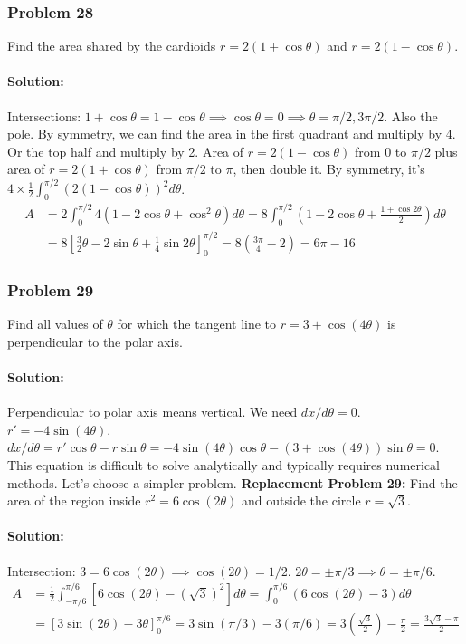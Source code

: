 \documentclass{article}
\begin{document}
\subsubsection*{Problem 28}
Find the area shared by the cardioids $r=2(1+\cos\theta)$ and $r=2(1-\cos\theta)$.
\paragraph{Solution:}
Intersections: $1+\cos\theta=1-\cos\theta \implies \cos\theta=0 \implies \theta=\pi/2, 3\pi/2$. Also the pole.
By symmetry, we can find the area in the first quadrant and multiply by 4. Or the top half and multiply by 2.
Area of $r=2(1-\cos\theta)$ from $0$ to $\pi/2$ plus area of $r=2(1+\cos\theta)$ from $\pi/2$ to $\pi$, then double it.
By symmetry, it's $4 \times \frac{1}{2} \int_0^{\pi/2} (2(1-\cos\theta))^2 d\theta$.
\begin{align*} A &= 2 \int_0^{\pi/2} 4(1-2\cos\theta+\cos^2\theta) d\theta = 8 \int_0^{\pi/2} (1-2\cos\theta+\frac{1+\cos2\theta}{2}) d\theta \\ &= 8 [\frac{3}{2}\theta-2\sin\theta+\frac{1}{4}\sin2\theta]_0^{\pi/2} = 8(\frac{3\pi}{4}-2) = 6\pi - 16 \end{align*}

\subsubsection*{Problem 29}
Find all values of $\theta$ for which the tangent line to $r=3+\cos(4\theta)$ is perpendicular to the polar axis.
\paragraph{Solution:}
Perpendicular to polar axis means vertical. We need $dx/d\theta=0$.
$r' = -4\sin(4\theta)$.
$dx/d\theta = r'\cos\theta - r\sin\theta = -4\sin(4\theta)\cos\theta - (3+\cos(4\theta))\sin\theta = 0$.
This equation is difficult to solve analytically and typically requires numerical methods.
Let's choose a simpler problem.
\textbf{Replacement Problem 29:}
Find the area of the region inside $r^2=6\cos(2\theta)$ and outside the circle $r=\sqrt{3}$.
\paragraph{Solution:}
Intersection: $3 = 6\cos(2\theta) \implies \cos(2\theta)=1/2$.
$2\theta = \pm \pi/3 \implies \theta = \pm \pi/6$.
\begin{align*} A &= \frac{1}{2}\int_{-\pi/6}^{\pi/6} [6\cos(2\theta) - (\sqrt{3})^2] d\theta = \int_0^{\pi/6} (6\cos(2\theta)-3) d\theta \\ &= [3\sin(2\theta)-3\theta]_0^{\pi/6} = 3\sin(\pi/3) - 3(\pi/6) = 3(\frac{\sqrt{3}}{2}) - \frac{\pi}{2} = \frac{3\sqrt{3}-\pi}{2} \end{align*}
\end{document}
